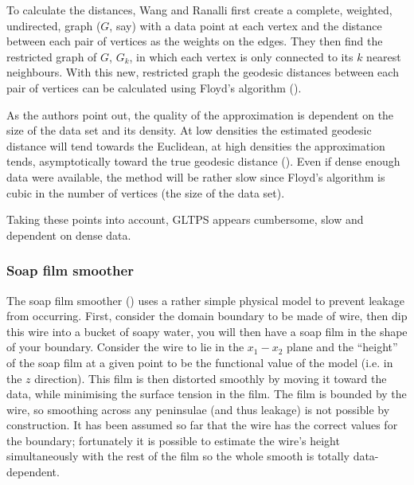 To calculate the distances, Wang and Ranalli first create a complete, weighted, undirected, graph ($G$, say) with a data point at each vertex and the distance between each pair of vertices as the weights on the edges. They then find the restricted graph of $G$, $G_k$, in which each vertex is only connected to its $k$ nearest neighbours. With this new, restricted graph the geodesic distances between each pair of vertices can be calculated using Floyd's algorithm (\cite{Floyd}).

As the authors point out, the quality of the approximation is dependent on the size of the data set and its density. At low densities the estimated geodesic distance will tend towards the Euclidean, at high densities the approximation tends, asymptotically toward the true geodesic distance (\cite{bernstein}). Even if  dense enough data were available, the method will be rather slow since Floyd's algorithm is cubic in the number of vertices (the size of the data set). 

Taking these points into account, GLTPS appears cumbersome, slow and dependent on dense data.

\subsubsection{Soap film smoother}

\label{cor-soaprev}The soap film smoother (\cite{soap}) uses a rather simple physical model to prevent leakage from occurring. First, consider the domain boundary to be made of wire, then dip this wire into a bucket of soapy water, you will then have a soap film in the shape of your boundary. Consider the wire to lie in the $x_1-x_2$ plane and the ``height'' of the soap film at a given point to be the functional value of the model (i.e. in the $z$ direction). This film is then distorted smoothly by moving it toward the data, while minimising the surface tension in the film. The film is bounded by the wire, so smoothing across any peninsulae (and thus leakage) is not possible by construction. It has been assumed so far that the wire has the correct values for the boundary; fortunately it is possible to estimate the wire's height simultaneously with the rest of the film so the whole smooth is totally data-dependent.

